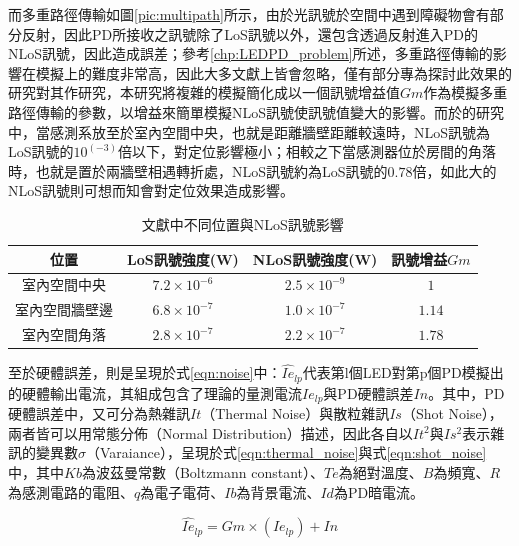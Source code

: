     而多重路徑傳輸如圖\ref{pic:multipath}所示，由於光訊號於空間中遇到障礙物會有部分反射，因此PD所接收之訊號除了LoS訊號以外，還包含透過反射進入PD的NLoS訊號，因此造成誤差；參考\ref{chp:LEDPD_problem}所述，多重路徑傳輸的影響在模擬上的難度非常高，因此大多文獻上皆會忽略，僅有部分專為探討此效果的研究對其作研究\cite{multipath_new}，本研究將複雜的模擬簡化成以一個訊號增益值$Gm$作為模擬多重路徑傳輸的參數，以增益來簡單模擬NLoS訊號使訊號值變大的影響。而於\cite{multipath_new}的研究中，當感測系放至於室內空間中央，也就是距離牆壁距離較遠時，NLoS訊號為LoS訊號的$10^(-3)$倍以下，對定位影響極小；相較之下當感測器位於房間的角落時，也就是置於兩牆壁相遇轉折處，NLoS訊號約為LoS訊號的$0.78$倍，如此大的NLoS訊號則可想而知會對定位效果造成影響。


    \begin{table}[htpb]
        \caption{文獻\cite{multipath_new}中不同位置與NLoS訊號影響}
        \label{tab:gain_multipath}
        \centering
        \begin{tabular}{|c||c|c||c|}
            \hline
        \textbf{位置}&\textbf{LoS訊號強度}(W)&\textbf{NLoS訊號強度}(W)&\textbf{訊號增益$Gm$}\\
            \hline\hline
        室內空間中央&$7.2\times 10^{-6}$ &$2.5\times 10^{-9}$&$1$ \\\hline
        室內空間牆壁邊 &$6.8\times 10^{-7}$ &$1.0\times 10^{-7}$&$1.14$\\\hline
        室內空間角落 &$2.8\times 10^{-7}$ & $2.2\times 10^{-7}$&$1.78$\\
        \hline
        \end{tabular}
    \end{table}

    
    至於硬體誤差，則是呈現於式\ref{eqn:noise}中：$\hat{Ie}_{lp}$代表第l個LED對第p個PD模擬出的硬體輸出電流，其組成包含了理論的量測電流$Ie_{lp}$與PD硬體誤差$In$。其中，PD硬體誤差中，又可分為熱雜訊$It$（Thermal Noise）與散粒雜訊$Is$（Shot Noise），兩者皆可以用常態分佈（Normal Distribution）描述，因此各自以$It^2$與$Is^2$表示雜訊的變異數$\sigma$（Varaiance），呈現於式\ref{eqn:thermal_noise}與式\ref{eqn:shot_noise}中，其中$Kb$為波茲曼常數（Boltzmann constant）、$Te$為絕對溫度、$B$為頻寬、$R$為感測電路的電阻、$q$為電子電荷、$Ib$為背景電流、$Id$為PD暗電流。

    \begin{equation}
    \label{eqn:noise}
        \hat{Ie}_{lp}=Gm\times (Ie_{lp})+In 
    \end{equation}


